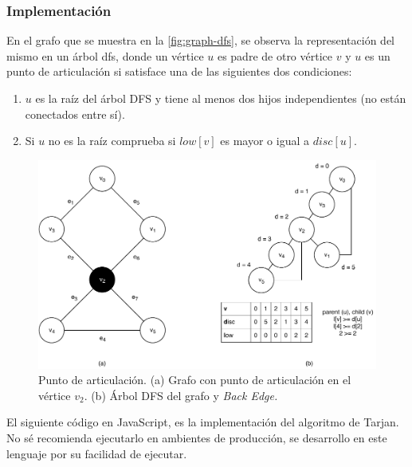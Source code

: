 \subsubsection{Implementación}
En el grafo que se muestra en la \autoref{fig:graph-dfs}, se observa la representación del mismo en un árbol \acrshort{dfs}, donde un vértice \( u \) es padre de otro vértice \( v \) y \( u \) es un punto de articulación si satisface una de las siguientes dos condiciones:
\begin{enumerate}
	\item \( u \) es la raíz del árbol DFS y tiene al menos dos hijos independientes (no están conectados entre sí).
	\item Si \( u \) no es la raíz comprueba si \( low[v] \) es mayor o igual a \( disc[u] \).
\end{enumerate}
\begin{figure}[H]
	\centering
	\includegraphics[width=0.8\linewidth]{document/ArticulationPoints/images/graph-dfs}
	\caption{Punto de articulación. (a) Grafo con punto de articulación en el vértice \( v_2 \). (b) Árbol DFS del grafo y \textit{Back Edge.}}
	\label{fig:graph-dfs}
\end{figure}

El siguiente código en JavaScript, es la implementación del algoritmo de Tarjan. No sé recomienda ejecutarlo en ambientes de producción, se desarrollo en este lenguaje por su facilidad de ejecutar.

